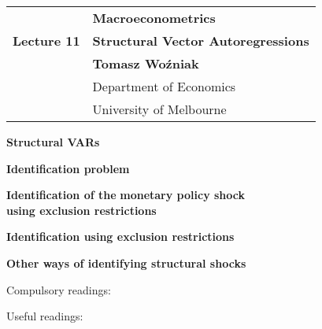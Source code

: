 \documentclass[notes,blackandwhite,mathsans,usenames,dvipsnames]{beamer}
\begin{document}







{
\begin{frame}

\vspace{1cm}
\begin{tabular}{rl}
&\textbf{\LARGE\color{mcxs3} Macroeconometrics}\\[8ex]
\textbf{\Large Lecture 11}&\textbf{\Large\color{mcxs5}Structural Vector Autoregressions}\\[19ex]
&\textbf{Tomasz Wo\'zniak}\\[1ex]
&{\small\color{mcxs5} Department of Economics}\\
&{\small\color{mcxs5}University of Melbourne}
\end{tabular}

\end{frame}
}





{
\begin{frame}

\bigskip 
\textbf{\color{purple}Structural VARs}

\bigskip\textbf{\color{mcxs1}Identification problem}

\bigskip\textbf{\color{mcxs1}Identification of the} \textbf{\color{purple}monetary policy shock}\\ \hspace{0.5cm}\textbf{\color{mcxs1}using exclusion restrictions}

\bigskip\textbf{\color{mcxs1}Identification using exclusion restrictions}

\bigskip\textbf{\color{mcxs1}Other ways of identifying structural shocks}

\bigskip 
\small
Compulsory readings: \scriptsize


\small
\bigskip Useful readings: \scriptsize


\end{frame}
}
\end{document}
